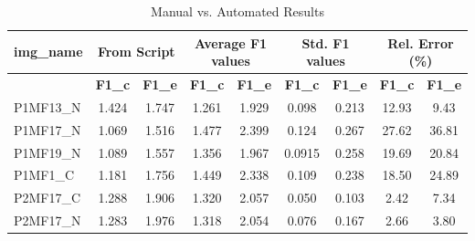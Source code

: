 \documentclass[preprint,12pt]{elsarticle}
\begin{document}
\begin{table}[ht]
\centering
\caption{Manual vs. Automated Results}
\label{manual_vs_automated_results}
\setlength{\tabcolsep}{4pt} %
\renewcommand{\arraystretch}{1} %
\begin{tabular}{|l|c|c|c|c|c|c|c|c|}
\hline
\textbf{img\_name} & \multicolumn{2}{c|}{\textbf{From Script}} & \multicolumn{2}{c|}{\textbf{Average F1 values}} & \multicolumn{2}{c|}{\textbf{Std. F1 values}} & \multicolumn{2}{c|}{\textbf{Rel. Error (\%)}} \\ \hline
 & \textbf{F1\_c} & \textbf{F1\_e} & \textbf{F1\_c} & \textbf{F1\_e} & \textbf{F1\_c} & \textbf{F1\_e} & \textbf{F1\_c} & \textbf{F1\_e} \\ \hline
P1MF13\_N & 1.424 & 1.747 & 1.261 & 1.929 & 0.098 & 0.213 & 12.93 & 9.43 \\ \hline
P1MF17\_N & 1.069 & 1.516 & 1.477 & 2.399 & 0.124 & 0.267 & 27.62 & 36.81 \\ \hline
P1MF19\_N & 1.089 & 1.557 & 1.356 & 1.967 & 0.0915 & 0.258 & 19.69 & 20.84 \\ \hline
P1MF1\_C & 1.181 & 1.756 & 1.449 & 2.338 & 0.109 & 0.238 & 18.50 & 24.89 \\ \hline
P2MF17\_C & 1.288 & 1.906 & 1.320 & 2.057 & 0.050 & 0.103 & 2.42 & 7.34 \\ \hline
P2MF17\_N & 1.283 & 1.976 & 1.318 & 2.054 & 0.076 & 0.167 & 2.66 & 3.80 \\ \hline
\end{tabular}
\end{table}
\end{document}
